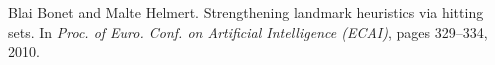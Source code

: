 \begin{thebibliography}{10}
\footnotesize

Blai Bonet and Malte Helmert.
\newblock Strengthening landmark heuristics via hitting sets.
\newblock In {\em Proc. of Euro. Conf. on Artificial Intelligence ({ECAI})},
pages 329--334, 2010.
\end{thebibliography}
